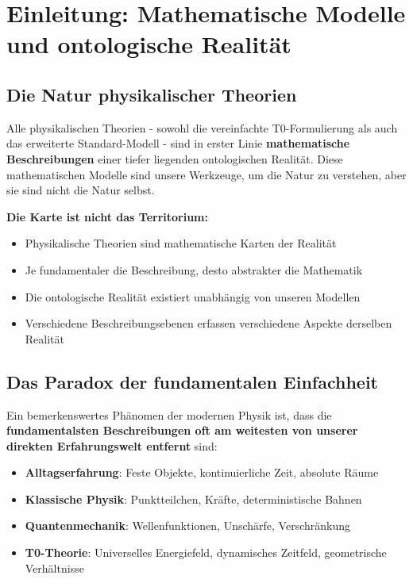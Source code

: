 \section{Einleitung: Mathematische Modelle und ontologische Realität}
	
	\subsection{Die Natur physikalischer Theorien}
	
	Alle physikalischen Theorien - sowohl die vereinfachte T0-Formulierung als auch das erweiterte Standard-Modell - sind in erster Linie \textbf{mathematische Beschreibungen} einer tiefer liegenden ontologischen Realität. Diese mathematischen Modelle sind unsere Werkzeuge, um die Natur zu verstehen, aber sie sind nicht die Natur selbst.
	
	\begin{tcolorbox}[colback=gray!5!white,colframe=gray!75!black,title=Fundamentale Erkenntnistheoretische Einsicht]
		\textbf{Die Karte ist nicht das Territorium:}
		\begin{itemize}
			\item Physikalische Theorien sind mathematische Karten der Realität
			\item Je fundamentaler die Beschreibung, desto abstrakter die Mathematik
			\item Die ontologische Realität existiert unabhängig von unseren Modellen
			\item Verschiedene Beschreibungsebenen erfassen verschiedene Aspekte derselben Realität
		\end{itemize}
	\end{tcolorbox}
	
	\subsection{Das Paradox der fundamentalen Einfachheit}
	
	Ein bemerkenswertes Phänomen der modernen Physik ist, dass die \textbf{fundamentalsten Beschreibungen oft am weitesten von unserer direkten Erfahrungswelt entfernt} sind:
	
	\begin{itemize}
		\item \textbf{Alltagserfahrung}: Feste Objekte, kontinuierliche Zeit, absolute Räume
		\item \textbf{Klassische Physik}: Punktteilchen, Kräfte, deterministische Bahnen
		\item \textbf{Quantenmechanik}: Wellenfunktionen, Unschärfe, Verschränkung
		\item \textbf{T0-Theorie}: Universelles Energiefeld, dynamisches Zeitfeld, geometrische Verhältnisse
	\end{itemize}
	
